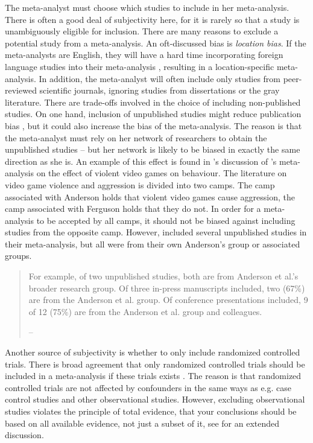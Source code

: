 The meta-analyst must choose which studies to include in her meta-analysis.
There is often a good deal of subjectivity here, for it is rarely
so that a study is unambiguously eligible for inclusion. There are
many reasons to exclude a potential study from a meta-analysis. An
oft-discussed bias is \emph{location bias}. If the meta-analysts
are English, they will have a hard time incorporating foreign language
studies into their meta-analysis \parencite{Egger1998-kj}, resulting
in a location-specific meta-analysis. In addition, the meta-analyst
will often include only studies from peer-reviewed scientific journals,
ignoring studies from dissertations or the gray literature. There
are trade-offs involved in the choice of including non-published studies.
On one hand, inclusion of unpublished studies might reduce publication
bias \parencite{Egger1997-ue},
but it could also increase the bias of the meta-analysis. The reason
is that the meta-analyst must rely on her network of researchers to
obtain the unpublished studies -- but her network is likely to be
biased in exactly the same direction as she is. An example of this
effect is found in \cite{Ferguson2010-to}'s discussion of \cite{Anderson2010-ki}'s
meta-analysis on the effect of violent video games on behaviour. The
literature on video game violence and aggression is divided into two
camps. The camp associated with Anderson holds that violent video
games cause aggression, the camp associated with Ferguson holds that
they do not. In order for a meta-analysis to be accepted by all camps,
it should not be biased against including studies from the opposite
camp. However, \cite{Anderson2010-ki} included several unpublished
studies in their meta-analysis, but all were from their own Anderson's
group or associated groups.
\begin{quote}
For example, of two unpublished studies, both are from Anderson et
al.'s broader research group. Of three in-press manuscripts
included, two (67\%) are from the Anderson et al. group. Of conference
presentations included, 9 of 12 (75\%) are from the Anderson et al.
group and colleagues. 
\begin{flushright}
-- \cite[p. 2]{Ferguson2010-to}
\par\end{flushright}

\end{quote}
Another source of subjectivity is whether to only include randomized
controlled trials. There is broad agreement that only randomized controlled
trials should be included in a meta-analysis if these trials exists
\parencite{Egger1997-ue}. The reason is that randomized
controlled trials are not affected by confounders in the same ways
as e.g. case control studies and other observational studies. However,
excluding observational studies violates the principle of total evidence,
that your conclusions should be based on all available evidence, not
just a subset of it, see \cite{Stegenga2011-zo} for an extended
discussion.

